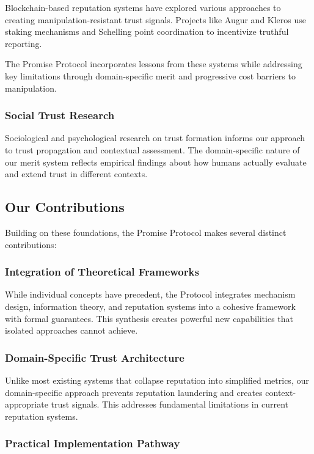 \documentclass[11pt]{article}
\begin{document}
Blockchain-based reputation systems have explored various approaches to creating manipulation-resistant trust signals. Projects like Augur and Kleros use staking mechanisms and Schelling point coordination to incentivize truthful reporting.

The Promise Protocol incorporates lessons from these systems while addressing key limitations through domain-specific merit and progressive cost barriers to manipulation.
\subsubsection{Social Trust Research}
\label{sec:org6fd653b}

Sociological and psychological research on trust formation informs our approach to trust propagation and contextual assessment. The domain-specific nature of our merit system reflects empirical findings about how humans actually evaluate and extend trust in different contexts.
\subsection{Our Contributions}
\label{sec:org033aef7}

Building on these foundations, the Promise Protocol makes several distinct contributions:
\subsubsection{Integration of Theoretical Frameworks}
\label{sec:orgf82dfdc}

While individual concepts have precedent, the Protocol integrates mechanism design, information theory, and reputation systems into a cohesive framework with formal guarantees. This synthesis creates powerful new capabilities that isolated approaches cannot achieve.
\subsubsection{Domain-Specific Trust Architecture}
\label{sec:orgbf6f636}

Unlike most existing systems that collapse reputation into simplified metrics, our domain-specific approach prevents reputation laundering and creates context-appropriate trust signals. This addresses fundamental limitations in current reputation systems.
\subsubsection{Practical Implementation Pathway}
\label{sec:orgde2c549}
\end{document}
